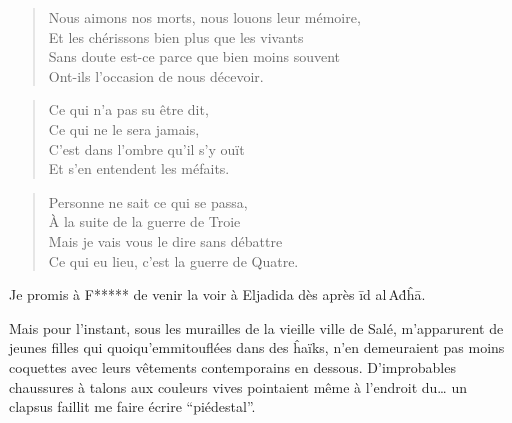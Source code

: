 \begin{verse}\quatrain
  Nous aimons nos morts, nous louons leur mémoire,\\  %
  Et les chérissons bien plus que les vivants\\  %
  Sans doute est-ce parce que bien moins souvent\\  %
  Ont-ils l’occasion de nous décevoir.
\end{verse}

\begin{verse}\quatrain
  Ce qui n’a pas su être dit,\\  %
  Ce qui ne le sera jamais,\\  %
  C’est dans l’ombre qu’il s’y ouït\\  %
  Et s’en entendent les méfaits.
\end{verse}

\begin{verse}\quatrain
  Personne ne sait ce qui se passa,\\  %
  À la suite de la guerre de Troie\\  %
  Mais je vais vous le dire sans  débattre\\  %
  Ce qui eu lieu, c’est la guerre de Quatre.
\end{verse}

\begin{prose}
Je promis à F***** de venir la voir à Eljadida dès après īd al\,Aḋĥā.
\end{prose}

\begin{prose}
  Mais pour l’instant, sous les murailles de la vieille ville de Salé, m’apparurent de jeunes filles qui quoiqu’emmitouflées dans des ĥaïks, n’en demeuraient pas moins coquettes avec leurs vêtements contemporains en dessous. D’improbables chaussures à talons aux couleurs vives pointaient même à l’endroit du… un clapsus faillit me faire écrire \enquote{piédestal}.
\end{prose}


